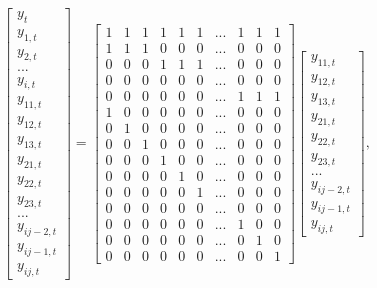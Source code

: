 \documentclass[12pt,a4paper, oneside]{extreport}
\begin{document}
\begin{equation}\label{key123}
\begin{bmatrix}
y_{t} \\
y_{1, t} \\
y_{2, t} \\
... \\
y_{i, t} \\
y_{11, t} \\
y_{12, t} \\
y_{13, t} \\
y_{21, t} \\
y_{22, t} \\
y_{23, t} \\

... \\
y_{ij-2, t} \\
y_{ij-1, t} \\
y_{ij, t}
\end{bmatrix}
=
\begin{bmatrix}
1& 1 &1& 1& 1& 1& ... &1& 1& 1 \\
1 &1& 1& 0& 0& 0& ... &0 &0 &0  \\
0 &0 &0 &1& 1& 1& ... &0 &0 &0  \\
0& 0& 0& 0& 0& 0& ...&0 &0 &0 \\ 
0& 0& 0& 0& 0& 0& ...& 1& 1& 1 \\
1 &0 &0& 0& 0& 0& ...& 0& 0& 0 \\
0 &1 &0& 0& 0& 0& ...& 0& 0& 0 \\
0 &0 &1& 0& 0& 0& ...& 0& 0& 0 \\
0 &0 &0& 1& 0& 0& ...& 0& 0& 0 \\
0 &0 &0& 0& 1& 0& ...& 0& 0& 0 \\
0 &0 &0& 0& 0& 1& ...& 0& 0& 0 \\
0& 0& 0& 0& 0& 0& ...&0 &0 &0  \\ 
0 &0 &0& 0& 0& 0& ...& 1& 0& 0 \\
0 &0 &0& 0& 0& 0& ...& 0& 1& 0 \\
0 &0 &0& 0& 0& 0& ...& 0& 0& 1 
\end{bmatrix}
\begin{bmatrix}
y_{11, t} \\
y_{12, t} \\
y_{13, t} \\
y_{21, t} \\
y_{22, t} \\
y_{23, t} \\

... \\
y_{ij-2, t} \\
y_{ij-1, t} \\
y_{ij, t}
\end{bmatrix},
\end{equation}
\end{document}
